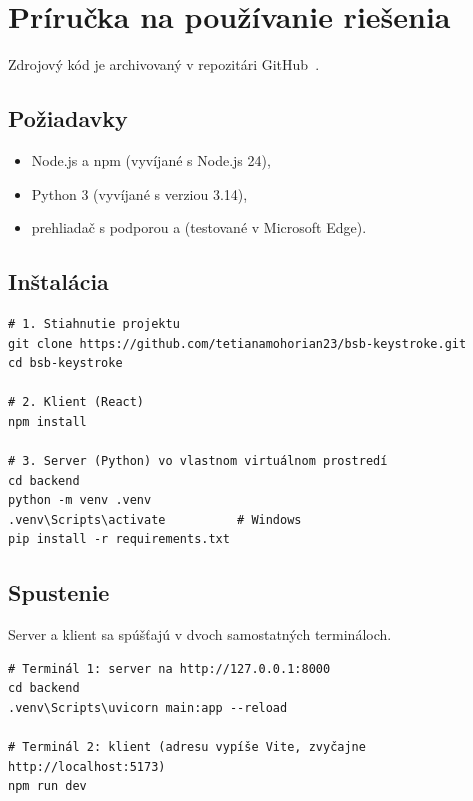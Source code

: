 \section{Príručka na používanie riešenia}
\label{sec:prirucka}

Zdrojový kód je archivovaný v repozitári GitHub~\cite{repo}.

\subsection{Požiadavky}

\begin{itemize}
  \item Node.js a npm (vyvíjané s Node.js 24),
  \item Python 3 (vyvíjané s verziou 3.14),
  \item prehliadač s podporou  a 
        (testované v Microsoft Edge).
\end{itemize}

\subsection{Inštalácia}

\begin{lstlisting}
# 1. Stiahnutie projektu
git clone https://github.com/tetianamohorian23/bsb-keystroke.git
cd bsb-keystroke

# 2. Klient (React)
npm install

# 3. Server (Python) vo vlastnom virtuálnom prostredí
cd backend
python -m venv .venv
.venv\Scripts\activate          # Windows
pip install -r requirements.txt
\end{lstlisting}

\subsection{Spustenie}

Server a klient sa spúšťajú v dvoch samostatných termináloch.

\begin{lstlisting}
# Terminál 1: server na http://127.0.0.1:8000
cd backend
.venv\Scripts\uvicorn main:app --reload

# Terminál 2: klient (adresu vypíše Vite, zvyčajne http://localhost:5173)
npm run dev
\end{lstlisting}

